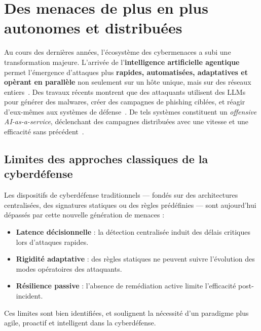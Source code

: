 \documentclass[ twoside,openright,titlepage,numbers=noenddot,headinclude,%
                footinclude=true,cleardoublepage=empty,abstractoff, %
                BCOR=5mm,paper=a4,fontsize=11pt,%
                french,american,%
                ]{scrreprt}
\begin{document}
\section{Des menaces de plus en plus autonomes et distribuées}\label{sec:evolution-menaces}


Au cours des dernières années, l'écosystème des cybermenaces a subi une transformation majeure. L'arrivée de l'\textbf{intelligence artificielle agentique} permet l'émergence d'attaques plus \textbf{rapides, automatisées, adaptatives et opèrant en parallèle} non seulement sur un hôte unique, mais sur des réseaux entiers~\cite{Cohen2020}. Des travaux récents montrent que des attaquants utilisent des LLMs pour générer des malwares, créer des campagnes de phishing ciblées, et réagir d'eux-mêmes aux systèmes de défense~\cite{AutoAttacker2024}. De tels systèmes constituent un {\em offensive AI-as-a-service}, déclenchant des campagnes distribuées avec une vitesse et une efficacité sans précédent~\cite{AgenticAIThreats2025}.

\subsection*{Limites des approches classiques de la cyberdéfense}

Les dispositifs de cyberdéfense traditionnels — fondés sur des architectures centralisées, des signatures statiques ou des règles prédéfinies — sont aujourd'hui dépassés par cette nouvelle génération de menaces :
\begin{itemize}
    \item \textbf{Latence décisionnelle} : la détection centralisée induit des délais critiques lors d'attaques rapides.
    \item \textbf{Rigidité adaptative} : des règles statiques ne peuvent suivre l'évolution des modes opératoires des attaquants.
    \item \textbf{Résilience passive} : l'absence de remédiation active limite l'efficacité post-incident.
\end{itemize}
Ces limites sont bien identifiées, et soulignent la nécessité d'un paradigme plus agile, proactif et intelligent dans la cyberdéfense.
\end{document}
